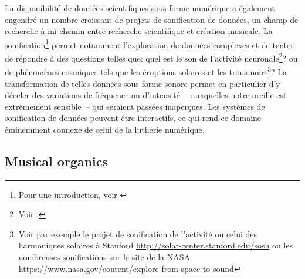 \indent La disponibilité de données scientifiques sous forme numérique a également engendré un nombre croissant de projets de sonification de données, un champ de recherche à mi-chemin entre recherche scientifique et création musicale. La sonification\footnote{Pour une introduction, voir \cite{hermann_sonification_2011}} permet notamment l'exploration de données complexes et de tenter de répondre à des questions telles que: quel est le son de l'activité neuronale\footnote{Voir \cite{verrier_interactive_2020}.}? ou de phénomènes cosmiques tels que les éruptions solaires et les trous noirs\footnote{Voir par exemple le projet de sonification de l'activité ou celui des harmoniques solaires à Stanford \url{http://solar-center.stanford.edu/sosh} ou les nombreuses sonifications sur le site de la NASA \url{https://www.nasa.gov/content/explore-from-space-to-sound}}? La transformation de telles données sous forme sonore permet en particulier d'y déceler des variations de fréquence ou d'intensité --~auxquelles notre oreille est extrêmement sensible~-- qui seraient passées inaperçues.
Les systèmes de sonification de données peuvent être interactifs, ce qui rend ce domaine éminemment connexe de celui de la lutherie numérique.

\subsection{Musical organics}
\label{sec:ephemerality:musical-organics}

